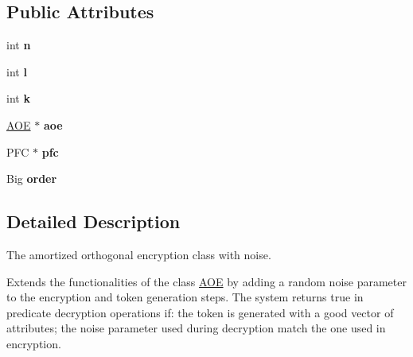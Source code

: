 \subsection*{Public Attributes}
\begin{DoxyCompactItemize}
\item 
\hypertarget{classAOENoise_a9958c324ac317477a9e20eaa619f43c3}{int {\bfseries n}}\label{classAOENoise_a9958c324ac317477a9e20eaa619f43c3}

\item 
\hypertarget{classAOENoise_a69d48da000f6becb069d0ab3bd1bce24}{int {\bfseries l}}\label{classAOENoise_a69d48da000f6becb069d0ab3bd1bce24}

\item 
\hypertarget{classAOENoise_a22d4c6d29fe7846fb4f5b3fe66f407df}{int {\bfseries k}}\label{classAOENoise_a22d4c6d29fe7846fb4f5b3fe66f407df}

\item 
\hypertarget{classAOENoise_a2903b460d92f60ce63b98ce26335ef61}{\hyperlink{classAOE}{A\-O\-E} $\ast$ {\bfseries aoe}}\label{classAOENoise_a2903b460d92f60ce63b98ce26335ef61}

\item 
\hypertarget{classAOENoise_a5d6f1295dc0bce01e3133c43e489e997}{P\-F\-C $\ast$ {\bfseries pfc}}\label{classAOENoise_a5d6f1295dc0bce01e3133c43e489e997}

\item 
\hypertarget{classAOENoise_abaa5eb8029cca74dab0256972b2971dc}{Big {\bfseries order}}\label{classAOENoise_abaa5eb8029cca74dab0256972b2971dc}

\end{DoxyCompactItemize}


\subsection{Detailed Description}
The amortized orthogonal encryption class with noise. 

Extends the functionalities of the class \hyperlink{classAOE}{A\-O\-E} by adding a random noise parameter to the encryption and token generation steps. The system returns true in predicate decryption operations if\-: the token is generated with a good vector of attributes; the noise parameter used during decryption match the one used in encryption. 

